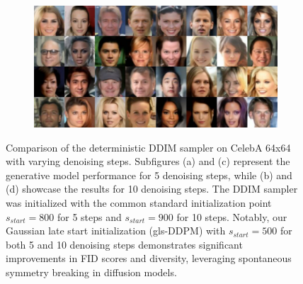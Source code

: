 \begin{figure}[h!]
\begin{subfigure}{0.495\textwidth}
    \includegraphics[width=\linewidth]{figs/imgs/ddpm_ddim_celeba64_data_samples_T_500_10_steps_ga_32_rec.jpg}
    \label{subfig:glsddim_celeba64}
  \end{subfigure}
  \caption{Comparison of the deterministic DDIM sampler on CelebA 64x64 with varying denoising steps.  Subfigures (a) and (c) represent the generative model performance for 5 denoising steps, while (b) and (d) showcase the results for 10 denoising steps. The DDIM  sampler was initialized with the common standard initialization point $s_{start}=800$ for 5 steps and $s_{start}=900$ for 10 steps. Notably, our Gaussian late start initialization (gls-DDPM) with $s_{start}=500$ for both 5 and 10 denoising steps demonstrates significant improvements in FID scores and diversity, leveraging spontaneous symmetry breaking in diffusion models.}
   \label{subfig:glsddim_celeba642}
\end{figure}




